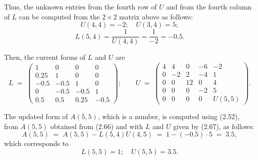 Thus, the unknown entries from the fourth row of $U$ and from the fourth
column of $L$ can be computed from the $2\times 2$ matrix above as follows:
\[
U(4,4)=-2;\quad U(3,4)=5;
\]
\[
L(5,4)=\dfrac{1}{U(4,4)}=\dfrac{1}{-2}=-0.5.
\]

Then, the current forms of $L$ and $U$ are
\begin{equation}
L \;=\;
\begin{pmatrix} 1 & 0 & 0 & 0\\ 0.25 & 1 & 0 & 0\\ -0.5 & -0.5 & 1 & 0\\ 0 & -0.5 & -0.5 & 1\\ 0.5 & 0.5 & 0.25 & -0.5 \end{pmatrix}
;\qquad
U \;=\;
\begin{pmatrix}
4 & 4 & 0 & -6 & -2\\
0 & -2 & 2 & -4 & 1\\
0 & 0 & 12 & 0 & 4\\
0 & 0 & 0 & -2 & 5\\
0 & 0 & 0 & 0 & U(5,5)
\end{pmatrix}.
\end{equation}

The updated form of $A(5,5)$, which is a number, is computed using (2.52),
from $A(5,5)$ obtained from (2.66) and with $L$ and $U$ given by (2.67), as
follows:
\[
A(5,5) \;=\; A(5,5) - L(5,4)U(4,5) \;=\; 1 - (-0.5)\cdot 5 \;=\; 3.5,
\]
which corresponds to
\[
L(5,5)=1;\quad U(5,5)=3.5.
\]

